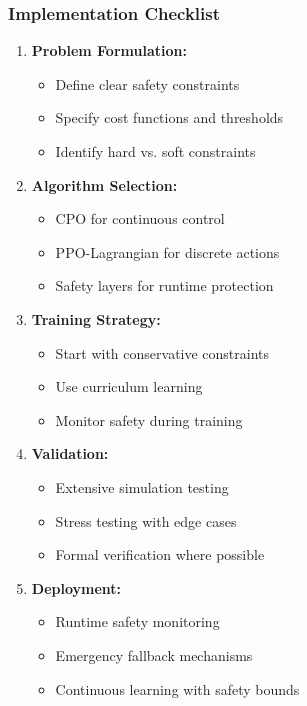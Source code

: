 \documentclass[12pt]{article}
\begin{document}
{{{{\subsubsection{Implementation Checklist}

\begin{enumerate}
\item \textbf{Problem Formulation:}
   \begin{itemize}
   \item Define clear safety constraints
   \item Specify cost functions and thresholds
   \item Identify hard vs. soft constraints
   \end{itemize}

\item \textbf{Algorithm Selection:}
   \begin{itemize}
   \item CPO for continuous control
   \item PPO-Lagrangian for discrete actions
   \item Safety layers for runtime protection
   \end{itemize}

\item \textbf{Training Strategy:}
   \begin{itemize}
   \item Start with conservative constraints
   \item Use curriculum learning
   \item Monitor safety during training
   \end{itemize}

\item \textbf{Validation:}
   \begin{itemize}
   \item Extensive simulation testing
   \item Stress testing with edge cases
   \item Formal verification where possible
   \end{itemize}

\item \textbf{Deployment:}
   \begin{itemize}
   \item Runtime safety monitoring
   \item Emergency fallback mechanisms
   \item Continuous learning with safety bounds
   \end{itemize}
\end{enumerate}

}}}}
\end{document}
